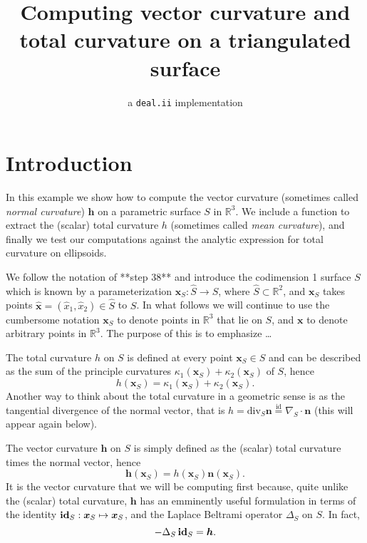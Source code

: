 \documentclass[10pt]{article}
\title{Computing vector curvature and total curvature on a triangulated surface}
\author{a  \texttt{deal.ii} implementation}
\date{ }
\newcommand{\R}{\mathbb{R}}
\newcommand{\mbf}[1]{\boldsymbol{#1}}
\begin{document}
\maketitle


\section*{Introduction}

In this example we show how to compute the vector curvature (sometimes called
\emph{normal curvature}) $\mbf{h}$ on a parametric surface $S$ in $\R^3$.
We include a function to extract the (scalar) total curvature $h$ (sometimes
called \emph{mean curvature}), and finally we test our computations against the
analytic expression for total curvature on ellipsoids.  

We follow the notation of **step 38** and introduce the codimension 1 surface
$S$ which is known by a parameterization $\mbf{x}_{S}: \hat{S} \to S$, where
$\hat{S} \subset \R^2$, and $\mbf{x}_S$ takes points $\hat{\mbf{x}} =
(\hat{x}_1, \hat{x}_2) \in \hat{S}$ to $S$.  In what follows we will continue
to use the cumbersome notation $\mbf{x}_S$ to denote points in $\R^3$ that lie
on $S$, and $\mbf{x}$ to denote arbitrary points in $\R^3$.  The purpose of
this is to emphasize \dots 

The total curvature $h$ on $S$ is defined at every point
$\mbf{x}_S \in S$ and can be described as the sum of the principle curvatures
$\kappa_1(\mbf{x}_S) + \kappa_2(\mbf{x}_S)$ of $S$, hence 
\[h(\mbf{x}_S) =  \kappa_1(\mbf{x}_S) + \kappa_2(\mbf{x}_S).\]
Another way to think about the total curvature in a geometric sense is as the
tangential divergence of the normal vector, that is $h = \text{div}_{S}
\mbf{n} \overset{\text{id}}{=} \nabla_S \cdot \mbf{n}$  (this will appear again below).

The vector curvature $\mbf{h}$ on $S$ is simply defined as the (scalar) total
curvature times the normal vector, hence \[\mbf{h}(\mbf{x}_S) =
h(\mbf{x}_S)\mbf{n}(\mbf{x}_S).\]   It is the vector curvature that we will be
computing first because, quite unlike the (scalar) total curvature, $\mbf{h}$
has an emminently useful formulation in terms of the identity $\text{\bf id}_S
: \mbf{x}_S \mapsto \mbf{x}_S$, and the Laplace Beltrami operator $\Delta_S$ on
$S$.  In fact, 
\[ - \Delta_S \, \text{\bf id}_S = \mbf{h}.\]
\end{document}
